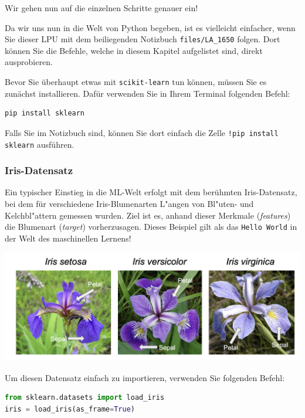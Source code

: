 \begin{lpu}
Wir gehen nun auf die einzelnen Schritte genauer ein!

\begin{hinweis}
    Da wir uns nun in die Welt von Python begeben, ist es vielleicht einfacher, wenn Sie dieser LPU mit dem beiliegenden Notizbuch \texttt{files/LA\_1650} folgen. Dort können Sie die Befehle, welche in diesem Kapitel aufgelistet sind, direkt ausprobieren.
\end{hinweis}

Bevor Sie überhaupt etwas mit \texttt{scikit-learn} tun können, müssen Sie es zunächst installieren. Dafür verwenden Sie in Ihrem Terminal folgenden Befehl:

\begin{lstlisting}[language=Bash]
pip install sklearn
\end{lstlisting}

Falls Sie im Notizbuch sind, können Sie dort einfach die Zelle \texttt{!pip install sklearn} ausführen.


\subsubsection*{Iris-Datensatz}
Ein typischer Einstieg in die ML-Welt erfolgt mit dem berühmten Iris-Datensatz, bei dem für verschiedene Iris-Blumenarten L"angen von Bl"uten- und Kelchbl"attern gemessen wurden. Ziel ist es, anhand dieser Merkmale (\textit{features}) die Blumenart (\textit{target}) vorherzusagen. Dieses Beispiel gilt als das \texttt{Hello World} in der Welt des maschinellen Lernens!

\begin{center}
  \includegraphics[width=0.9\linewidth]{iris.png}
\end{center}

Um diesen Datensatz einfach zu importieren, verwenden Sie folgenden Befehl:

\begin{lstlisting}[language=Python]
from sklearn.datasets import load_iris
iris = load_iris(as_frame=True)
\end{lstlisting}


\end{lpu}
